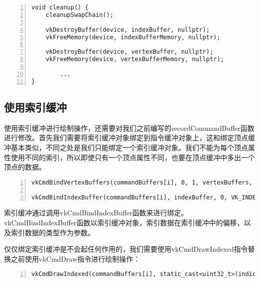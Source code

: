 \documentclass{ctexart}
\begin{document}
\begin{lstlisting}[language={[ANSI]C},keywordstyle=\color{blue!70},commentstyle=\color{red!50!green!50!blue!50},frame=shadowbox, rulesepcolor=\color{red!20!green!20!blue!20},basicstyle=\small,numbers=left, numberstyle=\tiny,breaklines=true]
void cleanup() {
	cleanupSwapChain();

	vkDestroyBuffer(device, indexBuffer, nullptr);
	vkFreeMemory(device, indexBufferMemory, nullptr);

	vkDestroyBuffer(device, vertexBuffer, nullptr);
	vkFreeMemory(device, vertexBufferMemory, nullptr);

		...
}
\end{lstlisting}

\subsection{使用索引缓冲}

使用索引缓冲进行绘制操作，还需要对我们之前编写的recordCommandBuffer函数进行修改。首先我们需要将索引缓冲对象绑定到指令缓冲对象上，这和绑定顶点缓冲基本类似，不同之处是我们只能绑定一个索引缓冲对象。我们不能为每个顶点属性使用不同的索引，所以即使只有一个顶点属性不同，也要在顶点缓冲中多出一个顶点的数据。

\begin{lstlisting}[language={[ANSI]C},keywordstyle=\color{blue!70},commentstyle=\color{red!50!green!50!blue!50},frame=shadowbox, rulesepcolor=\color{red!20!green!20!blue!20},basicstyle=\small,numbers=left, numberstyle=\tiny,breaklines=true]
vkCmdBindVertexBuffers(commandBuffers[i], 0, 1, vertexBuffers, offsets);

vkCmdBindIndexBuffer(commandBuffers[i], indexBuffer, 0, VK_INDEX_TYPE_UINT16);
\end{lstlisting}

索引缓冲通过调用vkCmdBindIndexBuffer函数来进行绑定。vkCmdBindIndexBuffer函数以索引缓冲对象，索引数据在索引缓冲中的偏移，以及索引数据的类型作为参数。

仅仅绑定索引缓冲是不会起任何作用的，我们需要使用vkCmdDrawIndexed指令替换之前使用vkCmdDraw指令进行绘制操作：

\begin{lstlisting}[language={[ANSI]C},keywordstyle=\color{blue!70},commentstyle=\color{red!50!green!50!blue!50},frame=shadowbox, rulesepcolor=\color{red!20!green!20!blue!20},basicstyle=\small,numbers=left, numberstyle=\tiny,breaklines=true]
vkCmdDrawIndexed(commandBuffers[i], static_cast<uint32_t>(indices.size()), 1, 0, 0, 0);
\end{lstlisting}
\end{document}
